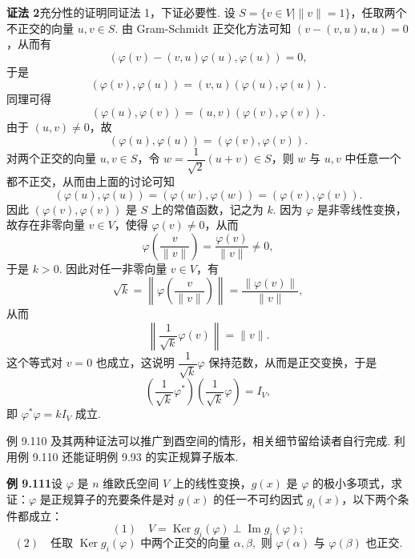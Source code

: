 \documentclass[UTF8, 12pt, fontset=fandol, oneside]{ctexart}
\begin{document}
\noindent\textbf{证法 2}\quad 充分性的证明同证法 1，下证必要性. 设 $S=\{v\in V\mid \|v\|=1\}$，任取两个不正交的向量 $u,v\in S$. 由 Gram-Schmidt 正交化方法可知 $(v-(v,u)u,u)=0$，从而有
\[
(\varphi(v)-(v,u)\varphi(u),\varphi(u))=0,
\]
于是
\[
(\varphi(v),\varphi(u))=(v,u)(\varphi(u),\varphi(u)).
\]
同理可得
\[
(\varphi(u),\varphi(v))=(u,v)(\varphi(v),\varphi(v)).
\]
由于 $(u,v)\ne0$，故
\[
(\varphi(u),\varphi(u))=(\varphi(v),\varphi(v)).
\]
对两个正交的向量 $u,v\in S$，令 $w=\dfrac{1}{\sqrt{2}}(u+v)\in S$，则 $w$ 与 $u,v$ 中任意一个都不正交，从而由上面的讨论可知
\[
(\varphi(u),\varphi(u))=(\varphi(w),\varphi(w))=(\varphi(v),\varphi(v)).
\]
因此 $(\varphi(v),\varphi(v))$ 是 $S$ 上的常值函数，记之为 $k$. 因为 $\varphi$ 是非零线性变换，故存在非零向量 $v\in V$，使得 $\varphi(v)\ne0$，从而
\[
\varphi\left(\frac{v}{\|v\|}\right)=\frac{\varphi(v)}{\|v\|}\ne0,
\]
于是 $k>0$. 因此对任一非零向量 $v\in V$，有
\[
\sqrt{k}=\left\|\varphi\left(\frac{v}{\|v\|}\right)\right\|=\frac{\|\varphi(v)\|}{\|v\|},
\]
从而
\[
\left\|\frac{1}{\sqrt{k}}\varphi(v)\right\|=\|v\|.
\]
这个等式对 $v=0$ 也成立，这说明 $\dfrac{1}{\sqrt{k}}\varphi$ 保持范数，从而是正交变换，于是
\[
\left(\frac{1}{\sqrt{k}}\varphi^*\right)\left(\frac{1}{\sqrt{k}}\varphi\right)=I_V,
\]
即 $\varphi^*\varphi=kI_V$ 成立.

例 9.110 及其两种证法可以推广到酉空间的情形，相关细节留给读者自行完成. 利用例 9.110 还能证明例 9.93 的实正规算子版本.

\noindent\textbf{例 9.111}\quad 设 $\varphi$ 是 $n$ 维欧氏空间 $V$ 上的线性变换，$g(x)$ 是 $\varphi$ 的极小多项式，求证：$\varphi$ 是正规算子的充要条件是对 $g(x)$ 的任一不可约因式 $g_i(x)$，以下两个条件都成立：
\[
(1)\quad V=\operatorname{Ker} g_i(\varphi)\perp\operatorname{Im} g_i(\varphi);
\]
\[
(2)\quad \text{任取 }\operatorname{Ker} g_i(\varphi)\text{ 中两个正交的向量 }\alpha,\beta,\text{ 则 }\varphi(\alpha)\text{ 与 }\varphi(\beta)\text{ 也正交.}
\]
\end{document}
